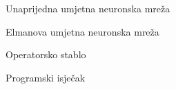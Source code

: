   \begin{frame}{Unaprijedna umjetna neuronska mreža}
  \end{frame}

  \begin{frame}{Elmanova umjetna neuronska mreža}
  \end{frame}

  \begin{frame}{Operatorsko stablo}
  \end{frame}

  \begin{frame}{Programski isječak}
  \end{frame}
